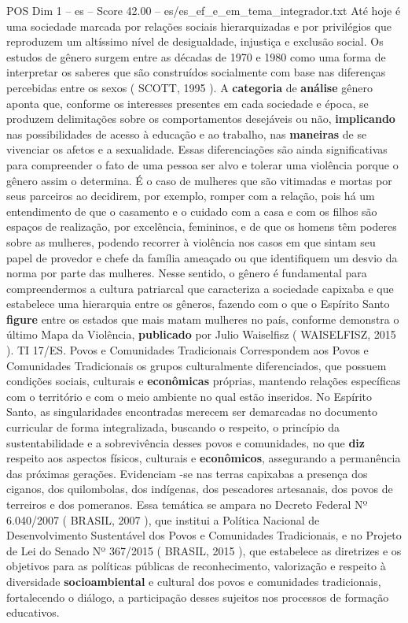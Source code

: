 \begin{textsample}{POS Dim 1 – es – Score 42.00 – es/es\_ef\_e\_em\_tema\_integrador.txt}
Até hoje é uma sociedade marcada por relações sociais hierarquizadas e por privilégios que reproduzem um altíssimo nível de desigualdade, injustiça e exclusão social.
Os estudos de gênero surgem entre as décadas de 1970 e 1980 como uma forma de interpretar os saberes que são construídos socialmente com base nas diferenças percebidas entre os sexos ( SCOTT, 1995 ).
A \textbf{categoria} de \textbf{análise} gênero aponta que, conforme os interesses presentes em cada sociedade e época, se produzem delimitações sobre os comportamentos desejáveis ou não, \textbf{implicando} nas possibilidades de acesso à educação e ao trabalho, nas \textbf{maneiras} de se vivenciar os afetos e a sexualidade.
Essas diferenciações são ainda significativas para compreender o fato de uma pessoa ser alvo e tolerar uma violência porque o gênero assim o determina.
É o caso de mulheres que são vitimadas e mortas por seus parceiros ao decidirem, por exemplo, romper com a relação, pois há um entendimento de que o casamento e o cuidado com a casa e com os filhos são espaços de realização, por excelência, femininos, e de que os homens têm poderes sobre as mulheres, podendo recorrer à violência nos casos em que sintam seu papel de provedor e chefe da família ameaçado ou que identifiquem um desvio da norma por parte das mulheres.
Nesse sentido, o gênero é fundamental para compreendermos a cultura patriarcal que caracteriza a sociedade capixaba e que estabelece uma hierarquia entre os gêneros, fazendo com o que o Espírito Santo \textbf{figure} entre os estados que mais matam mulheres no país, conforme demonstra o último Mapa da Violência, \textbf{publicado} por Julio Waiselfisz ( WAISELFISZ, 2015 ).
TI 17/ES.
Povos e Comunidades Tradicionais Correspondem aos Povos e Comunidades Tradicionais os grupos culturalmente diferenciados, que possuem condições sociais, culturais e \textbf{econômicas} próprias, mantendo relações específicas com o território e com o meio ambiente no qual estão inseridos.
No Espírito Santo, as singularidades encontradas merecem ser demarcadas no documento curricular de forma integralizada, buscando o respeito, o princípio da sustentabilidade e a sobrevivência desses povos e comunidades, no que \textbf{diz} respeito aos aspectos físicos, culturais e \textbf{econômicos}, assegurando a permanência das próximas gerações.
Evidenciam -se nas terras capixabas a presença dos ciganos, dos quilombolas, dos indígenas, dos pescadores artesanais, dos povos de terreiros e dos pomeranos.
Essa temática se ampara no Decreto Federal Nº 6.040/2007 ( BRASIL, 2007 ), que institui a Política Nacional de Desenvolvimento Sustentável dos Povos e Comunidades Tradicionais, e no Projeto de Lei do Senado Nº 367/2015 ( BRASIL, 2015 ), que estabelece as diretrizes e os objetivos para as políticas públicas de reconhecimento, valorização e respeito à diversidade \textbf{socioambiental} e cultural dos povos e comunidades tradicionais, fortalecendo o diálogo, a participação desses sujeitos nos processos de formação educativos.

\end{textsample}
